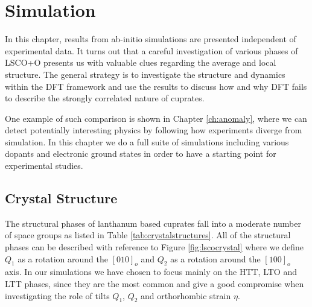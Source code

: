 \chapter{Simulation}
In this chapter, results from ab-initio simulations are presented independent of experimental data. It turns out that a careful investigation of various phases of LSCO+O presents us with valuable clues regarding the average and local structure. The general strategy is to investigate the structure and dynamics within the DFT framework and use the results to discuss how and why DFT fails to describe the strongly correlated nature of cuprates.

One example of such comparison is shown in Chapter \ref{ch:anomaly}, where we can detect potentially interesting physics by following how experiments diverge from simulation. In this chapter we do a full suite of simulations including various dopants and electronic ground states in order to have a starting point for experimental studies.

\section{Crystal Structure}
The structural phases of lanthanum based cuprates fall into a moderate number of space groups as listed in Table \ref{tab:crystalstructures}. All of the structural phases can be described with reference to Figure \ref{fig:lscocrystal} where we define $Q_1$ as a rotation around the $[010]_o$ and $Q_2$ as a rotation around the $[100]_o$ axis. In our simulations we have chosen to focus mainly on the HTT, LTO and LTT phases, since they are the most common and give a good compromise when investigating the role of tilts $Q_1$, $Q_2$ and orthorhombic strain $\eta$.

